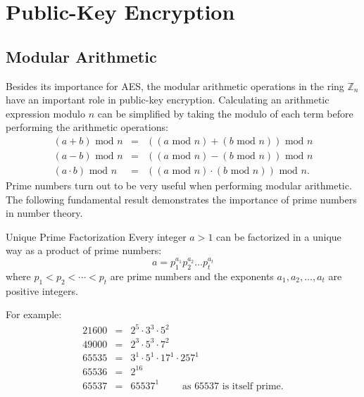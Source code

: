 
\chapter{Public-Key Encryption}


\section{Modular Arithmetic}
Besides its importance for AES, the modular arithmetic operations in the ring
$\mathbb{Z}_n$ have an important role in public-key encryption.
Calculating an arithmetic expression modulo $n$ can be simplified by taking the modulo of
each term before performing the arithmetic operations:
\begin{eqnarray*}
  (a+b)\mbox{ mod }n &=& ((a\mbox{ mod }n)+(b\mbox{ mod }n))\mbox{ mod }n \\
  (a-b)\mbox{ mod }n &=& ((a\mbox{ mod }n)-(b\mbox{ mod }n))\mbox{ mod }n \\
  (a\cdot b)\mbox{ mod }n &=& ((a\mbox{ mod }n)\cdot(b\mbox{ mod }n))\mbox{ mod }n.
\end{eqnarray*}
Prime numbers turn out to be very useful when performing modular arithmetic.
The following fundamental result demonstrates the importance of prime numbers in number theory.

\begin{theorem}{Unique Prime Factorization}
Every integer $a>1$ can be factorized in a unique way as a product of prime numbers:
\begin{displaymath}
  a = p_1^{a_1} p_2^{a_2} \dots p_t^{a_t}
\end{displaymath}
where $p_1<p_2<\cdots<p_t$ are prime numbers and the exponents
$a_1,a_2,\dots,a_t$ are positive integers.
\end{theorem}

For example:
\begin{eqnarray*}
  21600 &=& 2^5\cdot3^3\cdot5^2 \\
  49000 &=& 2^3\cdot5^3\cdot7^2 \\
  65535 &=& 3^1\cdot5^1\cdot17^1\cdot257^1 \\
  65536 &=& 2^{16} \\
  65537 &=& 65537^1 \qquad\mbox{ as $65537$ is itself prime}.
\end{eqnarray*}

